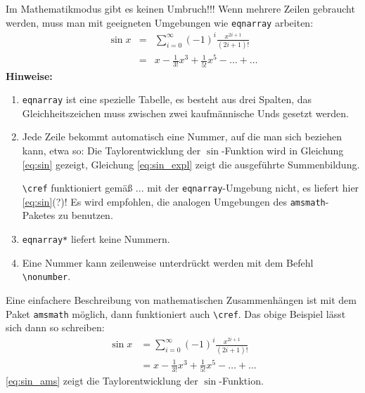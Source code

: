 Im Mathematikmodus gibt es keinen Umbruch!!! Wenn mehrere Zeilen gebraucht
werden, muss man mit geeigneten Umgebungen wie \texttt{eqnarray} arbeiten:
\begin{eqnarray}
  \label{eq:sin}%
  \sin x & = & \sum_{i=0}^{\infty}(-1)^{i}\frac{x^{2i+1}}{(2i+1)!}
  \\
  \label{eq:sin_expl}       & = & x - \frac{1}{3!}x^{3} + \frac{1}{5!}x^{5} - \ldots + \ldots
\end{eqnarray}
\textbf{Hinweise:}
\begin{enumerate}
  \item \texttt{eqnarray} ist eine spezielle Tabelle, es besteht aus drei
    Spalten, das Gleichheitszeichen muss zwischen zwei kaufmännische Unds
    gesetzt werden.
  \item Jede Zeile bekommt automatisch eine Nummer, auf die man sich
    beziehen kann, etwa so: Die Taylorentwicklung der \(\sin\)-Funktion
    wird in Gleichung \ref{eq:sin} gezeigt, Gleichung \ref{eq:sin_expl}
    zeigt die ausgeführte Summenbildung.

    \lstinline|\cref| funktioniert gemäß ...  mit der
    \texttt{eqnarray}-Umgebung nicht, es liefert hier \cref{eq:sin}(?)! Es
    wird empfohlen, die analogen Umgebungen des \texttt{amsmath}-Paketes zu
    benutzen.
  \item \texttt{eqnarray*} liefert keine Nummern.
  \item Eine Nummer kann zeilenweise unterdrückt werden mit dem
    Befehl \lstinline|\nonumber|.
\end{enumerate}

Eine einfachere Beschreibung von mathematischen Zusammenhängen ist mit dem
Paket \texttt{amsmath} möglich, dann funktioniert
auch \lstinline|\cref|. Das obige Beispiel lässt sich dann so schreiben:
\begin{equation}
    \begin{split}
      \label{eq:sin_ams}%
      \sin x &=  \sum_{i=0}^{\infty}(-1)^{i}\frac{x^{2i+1}}{(2i+1)!}
      \\
             &=  x - \frac{1}{3!}x^{3} + \frac{1}{5!}x^{5} - \ldots + \ldots
    \end{split}
\end{equation}
\cref{eq:sin_ams} zeigt die Taylorentwicklung der \(\sin\)-Funktion.

